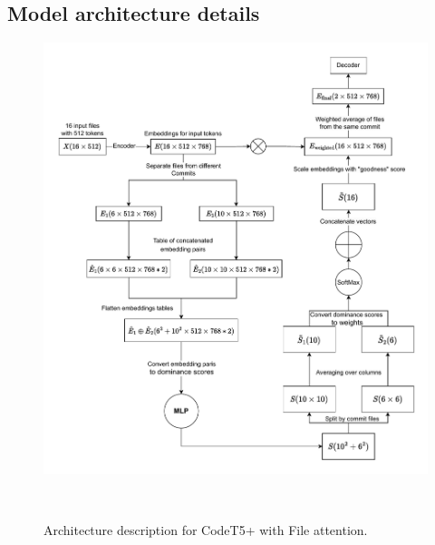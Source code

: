 \subsection{Model architecture details}\label{subsec:fileattn_arch_details}

\begin{figure}[H]
    \includegraphics[scale=0.75]{figs/arch_v5.drawio.pdf}
    \caption{Architecture description for CodeT5+ with File attention.}
    ~\label{fig:file_attention_pipeline}
\end{figure}

